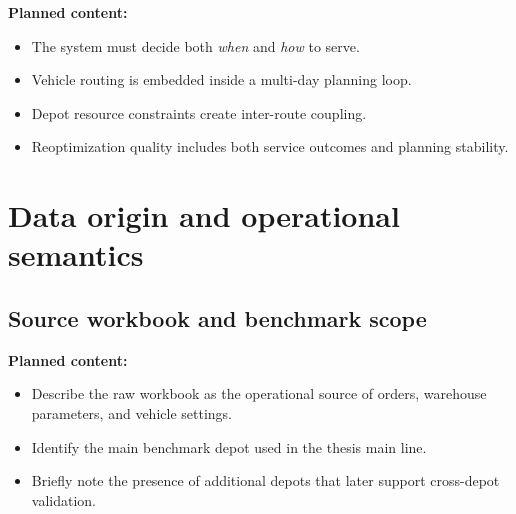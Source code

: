 \noindent\textbf{Planned content:}
\begin{itemize}
    \item The system must decide both \emph{when} and \emph{how} to serve.
    \item Vehicle routing is embedded inside a multi-day planning loop.
    \item Depot resource constraints create inter-route coupling.
    \item Reoptimization quality includes both service outcomes and planning stability.
\end{itemize}

\section{Data origin and operational semantics}
\label{sec:chapter03_data_and_semantics}

%

\subsection{Source workbook and benchmark scope}
\label{subsec:chapter03_source_workbook}

%

\noindent\textbf{Planned content:}
\begin{itemize}
    \item Describe the raw workbook as the operational source of orders, warehouse parameters, and vehicle settings.
    \item Identify the main benchmark depot used in the thesis main line.
    \item Briefly note the presence of additional depots that later support cross-depot validation.
\end{itemize}

